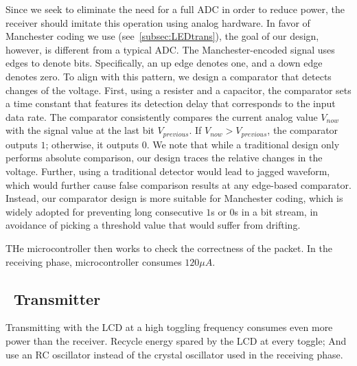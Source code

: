 Since we seek to eliminate the need for a full ADC in order to reduce power, the receiver should imitate this operation using analog hardware. In favor of Manchester coding we use (see~\ref{subsec:LEDtrans}), the goal of our design, however, is different from a typical ADC. The Manchester-encoded signal uses edges to denote bits. Specifically, an up edge denotes one, and a down edge denotes zero. To align with this pattern, we design a comparator that detects changes of the voltage. First, using a resister and a capacitor, the comparator sets a time constant that features its detection delay that corresponds to the input data rate. The comparator consistently compares the current analog value $V_{now}$ with the signal value at the last bit $V_{previous}$. If $V_{now} > V_{previous}$, the comparator outputs $1$; otherwise, it outputs $0$. We note that while a traditional design only performs absolute comparison, our design traces the relative changes in the voltage. Further, using a traditional detector would lead to jagged waveform, which would further cause false comparison results at any edge-based comparator. Instead, our comparator design is more suitable for Manchester coding, which is widely adopted for preventing long consecutive $1$s or $0$s in a bit stream, in avoidance of picking a threshold value that would suffer from drifting. 

THe microcontroller then works to check the correctness of the packet. In the receiving phase, microcontroller consumes $120\mu A$.





\subsection{\vitag\ Transmitter}
\label{subsec:tagtrans}

\begin{tcolorbox}
\vskip 0.05in Transmitting with the LCD at a high toggling frequency consumes even more power than the receiver.
\vskip 0.05in Recycle energy spared by the LCD at every toggle; And use an RC oscillator instead of the crystal oscillator used in the receiving phase.
\end{tcolorbox}


